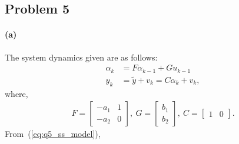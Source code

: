 \subsection*{Problem 5}
\paragraph{(a)} The system dynamics given are as follows:
\begin{align}\label{eq:q5_ss_model}
	\alpha_k &= F \alpha_{k-1} + G u_{k-1} \nonumber\\
	y_k &= \tilde{y} + v_k = C\alpha_k + v_k,
\end{align}
where,
\begin{align*}
	F = \begin{bmatrix}-a_1 & 1\\-a_2 & 0\end{bmatrix},\ G = \begin{bmatrix}b_1\\b_2\end{bmatrix},\ C = \begin{bmatrix}1 & 0\end{bmatrix}.
\end{align*}
From~(\ref{eq:q5_ss_model}),
